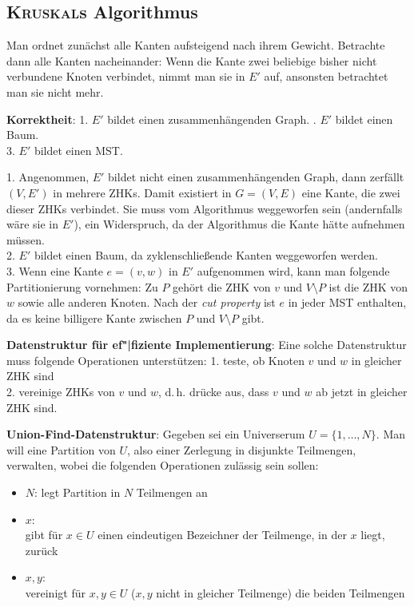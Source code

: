 \subsection{%
    \textsc{Kruskal}s Algorithmus%
}

Man ordnet zunächst alle Kanten aufsteigend nach ihrem Gewicht.
Betrachte dann alle Kanten nacheinander:
Wenn die Kante zwei beliebige bisher nicht verbundene Knoten verbindet,
nimmt man sie in $E'$ auf, ansonsten betrachtet man sie nicht mehr.

\linie

\textbf{Korrektheit}:
1. $E'$ bildet einen zusammenhängenden Graph. . $E'$ bildet einen Baum. \\
3. $E'$ bildet einen MST.

\begin{Beweis}
    1. Angenommen, $E'$ bildet nicht einen zusammenhängenden Graph,
    dann zerfällt $(V, E')$ in mehrere ZHKs.
    Damit existiert in $G = (V, E)$ eine Kante, die zwei dieser ZHKs verbindet.
    Sie muss vom Algorithmus weggeworfen sein (andernfalls wäre sie in $E'$),
    ein Widerspruch, da der Algorithmus die Kante hätte aufnehmen müssen. \\
    2. $E'$ bildet einen Baum, da zyklenschließende Kanten weggeworfen
    werden. \\
    3. Wenn eine Kante $e = (v, w)$ in $E'$ aufgenommen wird, kann man folgende
    Partitionierung vornehmen:
    Zu $P$ gehört die ZHK von $v$ und $V \setminus P$ ist die ZHK von $w$
    sowie alle anderen Knoten.
    Nach der \emph{cut property} ist $e$ in jeder MST enthalten, da es keine
    billigere Kante zwischen $P$ und $V \setminus P$ gibt.
\end{Beweis}

\linie

\textbf{Datenstruktur für ef"|fiziente Implementierung}:
Eine solche Datenstruktur muss folgende Operationen unterstützen:
1. teste, ob Knoten $v$ und $w$ in gleicher ZHK sind \\
2. vereinige ZHKs von $v$ und $w$,
d.\,h. drücke aus, dass $v$ und $w$ ab jetzt in gleicher ZHK sind.

\textbf{Union-Find-Datenstruktur}:
Gegeben sei ein Universerum $U = \{1, \dotsc, N\}$.
Man will eine Partition von $U$, also einer Zerlegung in disjunkte Teilmengen,
verwalten, wobei die folgenden Operationen zulässig sein sollen:
\begin{itemize}
    \item
    \textbf{$N$\code{)}}:
    legt Partition in $N$ Teilmengen an
    
    \item
    \textbf{$x$\code{)}}: \\
    gibt für $x \in U$ einen eindeutigen Bezeichner der Teilmenge, in der
    $x$ liegt, zurück
    
    \item
    \textbf{$x, y$\code{)}}: \\
    vereinigt für $x, y \in U$ ($x, y$ nicht in gleicher Teilmenge)
    die beiden Teilmengen
\end{itemize}


